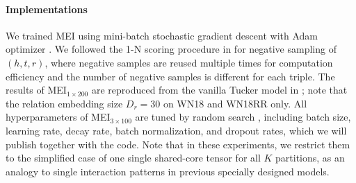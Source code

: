 \documentclass{ecai}
\theoremstyle{plain}  \newtheorem{thm}{Theorem}  \newtheorem{lem}[thm]{Lemma}  \newtheorem{prop}[thm]{Proposition}
\theoremstyle{remark}  \newtheorem*{rem}{Remark}
\begin{document}
\paragraph{Implementations}
We trained MEI using mini-batch stochastic gradient descent with Adam optimizer \cite{kingma_adammethodstochastic_2015}. We followed the 1-N scoring procedure in \cite{dettmers_convolutional2dknowledge_2018} for negative sampling of $ (h, t, r) $, where negative samples are reused multiple times for computation efficiency and the number of negative samples is different for each triple. The results of MEI$ _{1 \times 200} $ are reproduced from the vanilla Tucker model in \cite{balazevic_tuckertensorfactorization_2019}; note that the relation embedding size $ D_r = 30 $ on WN18 and WN18RR only. All hyperparameters of MEI$ _{3 \times 100} $ are tuned by random search \cite{bergstra_randomsearchhyperparameter_2012}, including batch size, learning rate, decay rate, batch normalization, and dropout rates, which we will publish together with the code. Note that in these experiments, we restrict them to the simplified case of one single shared-core tensor for all $ K $ partitions, as an analogy to single interaction patterns in previous specially designed models.
\end{document}
